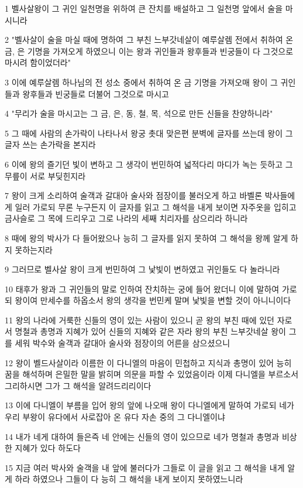 \par 1 벨사살왕이 그 귀인 일천명을 위하여 큰 잔치를 배설하고 그 일천명 앞에서 술을 마시니라
\par 2 "벨사살이 술을 마실 때에 명하여 그 부친 느부갓네살이 예루살렘 전에서 취하여 온 금, 은 기명을 가져오게 하였으니 이는 왕과 귀인들과 왕후들과 빈궁들이 다 그것으로 마시려 함이었더라"
\par 3 이에 예루살렘 하나님의 전 성소 중에서 취하여 온 금 기명을 가져오매 왕이 그 귀인들과 왕후들과 빈궁들로 더불어 그것으로 마시고
\par 4 "무리가 술을 마시고는 그 금, 은, 동, 철, 목, 석으로 만든 신들을 찬양하니라"
\par 5 그 때에 사람의 손가락이 나타나서 왕궁 촛대 맞은편 분벽에 글자를 쓰는데 왕이 그 글자 쓰는 손가락을 본지라
\par 6 이에 왕의 즐기던 빛이 변하고 그 생각이 번민하여 넓적다리 마디가 녹는 듯하고 그 무릎이 서로 부딪힌지라
\par 7 왕이 크게 소리하여 술객과 갈대아 술사와 점장이를 불러오게 하고 바벨론 박사들에게 일러 가로되 무론 누구든지 이 글자를 읽고 그 해석을 내게 보이면 자주옷을 입히고 금사슬로 그 목에 드리우고 그로 나라의 세째 치리자를 삼으리라 하니라
\par 8 때에 왕의 박사가 다 들어왔으나 능히 그 글자를 읽지 못하여 그 해석을 왕께 알게 하지 못하는지라
\par 9 그러므로 벨사살 왕이 크게 번민하여 그 낯빛이 변하였고 귀인들도 다 놀라니라
\par 10 태후가 왕과 그 귀인들의 말로 인하여 잔치하는 궁에 들어 왔더니 이에 말하여 가로되 왕이여 만세수를 하옵소서 왕의 생각을 번민케 말며 낯빛을 변할 것이 아니니이다
\par 11 왕의 나라에 거룩한 신들의 영이 있는 사람이 있으니 곧 왕의 부친 때에 있던 자로서 명철과 총명과 지혜가 있어 신들의 지혜와 같은 자라 왕의 부친 느부갓네살 왕이 그를 세워 박수와 술객과 갈대아 술사와 점장이의 어른을 삼으셨으니
\par 12 왕이 벨드사살이라 이름한 이 다니엘의 마음이 민첩하고 지식과 총명이 있어 능히 꿈을 해석하며 은밀한 말을 밝히며 의문을 파할 수 있었음이라 이제 다니엘을 부르소서 그리하시면 그가 그 해석을 알려드리리이다
\par 13 이에 다니엘이 부름을 입어 왕의 앞에 나오매 왕이 다니엘에게 말하여 가로되 네가 우리 부왕이 유다에서 사로잡아 온 유다 자손 중의 그 다니엘이냐
\par 14 내가 네게 대하여 들은즉 네 안에는 신들의 영이 있으므로 네가 명철과 총명과 비상한 지혜가 있다 하도다
\par 15 지금 여러 박사와 술객을 내 앞에 불러다가 그들로 이 글을 읽고 그 해석을 내게 알게 하라 하였으나 그들이 다 능히 그 해석을 내게 보이지 못하였느니라
